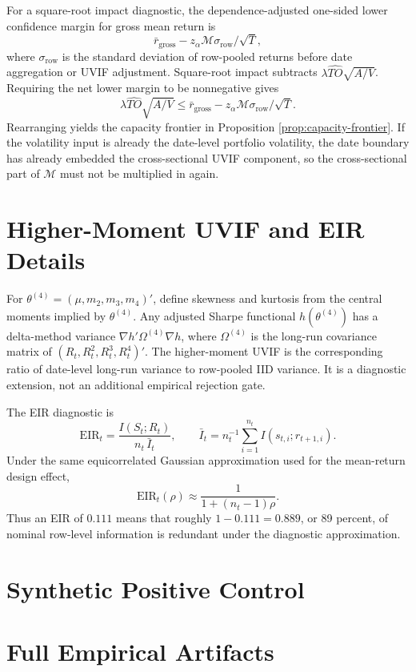 \documentclass[12pt,a4paper]{article}
\begin{document}
For a square-root impact diagnostic, the dependence-adjusted one-sided
lower confidence margin for gross mean return is
\[
  \bar r_{\mathrm{gross}}
  - z_{\alpha}\mathcal M\sigma_{\mathrm{row}}/\sqrt{T},
\]
where \(\sigma_{\mathrm{row}}\) is the standard deviation of row-pooled
returns before date aggregation or UVIF adjustment.  Square-root impact
subtracts \(\lambda\widehat{TO}\sqrt{A/V}\).  Requiring the net lower
margin to be nonnegative gives
\[
  \lambda\widehat{TO}\sqrt{A/V}
  \le
  \bar r_{\mathrm{gross}}
  - z_{\alpha}\mathcal M\sigma_{\mathrm{row}}/\sqrt{T}.
\]
Rearranging yields the capacity frontier in Proposition
\ref{prop:capacity-frontier}.  If
the volatility input is already the date-level portfolio volatility, the
date boundary has already embedded the cross-sectional UVIF component,
so the cross-sectional part of \(\mathcal M\) must not be multiplied in
again.

\section{Higher-Moment UVIF and EIR Details}

For \(\theta^{(4)}=(\mu,m_2,m_3,m_4)'\), define skewness and kurtosis
from the central moments implied by \(\theta^{(4)}\).  Any adjusted
Sharpe functional \(h(\theta^{(4)})\) has a delta-method variance
\(\nabla h'\Omega^{(4)}\nabla h\), where \(\Omega^{(4)}\) is the
long-run covariance matrix of \((R_t,R_t^2,R_t^3,R_t^4)'\).  The
higher-moment UVIF is the corresponding ratio of date-level long-run
variance to row-pooled IID variance.  It is a diagnostic extension, not
an additional empirical rejection gate.

The EIR diagnostic is
\[
  \mathrm{EIR}_t
  =
  \frac{I(S_t;R_t)}
       {n_t\,\bar I_t},
  \qquad
  \bar I_t=n_t^{-1}\sum_{i=1}^{n_t}I(s_{t,i};r_{t+1,i}).
\]
Under the same equicorrelated Gaussian approximation used for the
mean-return design effect,
\[
  \mathrm{EIR}_t(\rho)\approx \frac{1}{1+(n_t-1)\rho}.
\]
Thus an EIR of \(0.111\) means that roughly \(1-0.111=0.889\), or 89
percent, of nominal row-level information is redundant under the
diagnostic approximation.

\section{Synthetic Positive Control}



\section{Full Empirical Artifacts}
\end{document}
